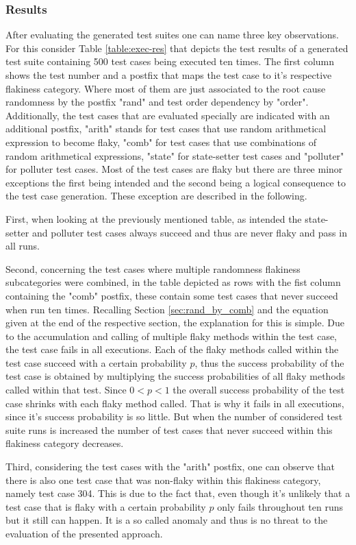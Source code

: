 \documentclass[
fancyheadings, %
%
%
]{stsreprt}
\begin{document}
\subsubsection{Results}
After evaluating the generated test suites one can name three key observations.
For this consider Table \ref{table:exec-res} that depicts the test results of a generated test suite containing 500 test cases being executed ten times. The first column shows the test number and a postfix that maps the test case to it's respective flakiness category.
Where most of them are just associated to the root cause randomness by the postfix "rand" and test order dependency by "order". 
Additionally, the test cases that are evaluated specially are indicated with an additional postfix, "arith" stands for test cases that use random arithmetical expression to become flaky, "comb" for test cases that use combinations of random arithmetical expressions, "state" for state-setter test cases and "polluter" for polluter test cases.  
Most of the test cases are flaky but there are three minor exceptions the first being intended and the second being a logical consequence to the test case generation. These exception are described in the following. \par
First, when looking at the previously mentioned table, as intended the state-setter and polluter test cases always succeed and thus are never flaky and pass in all runs. \par
Second, concerning the test cases where multiple randomness flakiness subcategories were combined, in the table depicted as rows with the fist column containing the "comb" postfix, these contain some test cases that never succeed when run ten times. 
Recalling Section \ref{sec:rand_by_comb} and the equation given at the end of the respective section, the explanation for this is simple. 
Due to the accumulation and calling of multiple flaky methods within the test case, the test case fails in all executions. 
Each of the flaky methods called within the test case succeed with a certain probability $p$, thus the success probability of the test case is obtained by multiplying the success probabilities of all flaky methods called within that test. 
Since $0 < p < 1$ the overall success probability of the test case shrinks with each flaky method called. 
That is why it fails in all executions, since it's success probability is so little. 
But when the number of considered test suite runs is increased the number of test cases that never succeed within this flakiness category decreases. \par
Third, considering the test cases with the "arith" postfix, one can observe that there is also one test case that was non-flaky within this flakiness category, namely test case 304. 
This is due to the fact that, even though it's unlikely that a test case that is flaky with a certain probability $p$ only fails throughout ten runs but it still can happen.
It is a so called anomaly and thus is no threat to the evaluation of the presented approach. 
\end{document}
